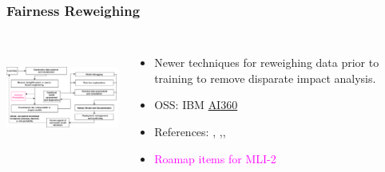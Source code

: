 \documentclass[11pt,
               aspectratio=169,
               hyperref={colorlinks}
               ]{beamer}
\begin{document}
		\begin{frame}
		
			\frametitle{Fairness Reweighing}		
			
			\begin{columns}
	
				\centering
				\includegraphics[height=100pt]{img/fr.png}
				
				\vspace{-5pt}
				\begin{itemize}
					\item Newer techniques for reweighing data prior to training to remove disparate impact analysis.
					\item OSS: IBM \href{https://github.com/IBM/AIF360}{AI360}
					\item References: \cite{calders2010three}, \cite{kamiran2012data},\cite{feldman2015certifying}, \cite{calmon2017optimized}
					\item \textcolor{magenta}{Roamap items for MLI-2}
				\end{itemize}
				
			\end{columns}			
			
		\end{frame}
\end{document}
